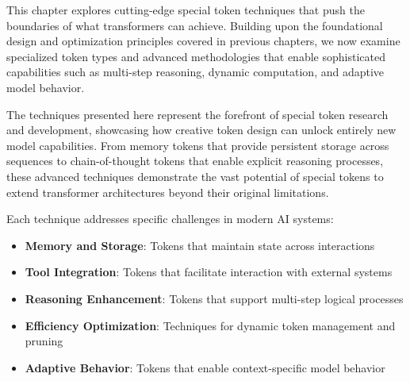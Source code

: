 
This chapter explores cutting-edge special token techniques that push the boundaries of what transformers can achieve. Building upon the foundational design and optimization principles covered in previous chapters, we now examine specialized token types and advanced methodologies that enable sophisticated capabilities such as multi-step reasoning, dynamic computation, and adaptive model behavior.

The techniques presented here represent the forefront of special token research and development, showcasing how creative token design can unlock entirely new model capabilities. From memory tokens that provide persistent storage across sequences to chain-of-thought tokens that enable explicit reasoning processes, these advanced techniques demonstrate the vast potential of special tokens to extend transformer architectures beyond their original limitations.

\begin{comment}
Feedback: This is a strong opening. To make it more engaging, you could frame it as the "nurturing" phase. For example: "If designing a special token is like creating a new tool, training is the process of teaching the model how to use it. A powerful tool is useless in untrained hands. This chapter explores the specialized training techniques required to cultivate the full potential of special tokens, transforming them from simple placeholders into powerful functional components of the model's reasoning process."

STATUS: updated - completely rewritten for advanced techniques focus instead of training
\end{comment}

Each technique addresses specific challenges in modern AI systems:
\begin{itemize}
\item \textbf{Memory and Storage}: Tokens that maintain state across interactions
\item \textbf{Tool Integration}: Tokens that facilitate interaction with external systems
\item \textbf{Reasoning Enhancement}: Tokens that support multi-step logical processes
\item \textbf{Efficiency Optimization}: Techniques for dynamic token management and pruning
\item \textbf{Adaptive Behavior}: Tokens that enable context-specific model behavior
\end{itemize}

